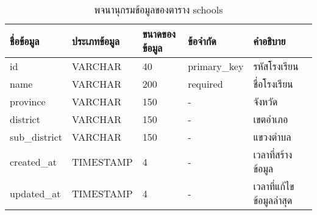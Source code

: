 \begin{table}[H]
    \caption{พจนานุกรมข้อมูลของตาราง schools}
    \label{tab:database-schools}
    \begin{tabularx}{\textwidth}{ | p{2.25cm} | p{2.20cm} | p{2.45cm} | p{2cm} | X | }
    \hline
    \textbf{ชื่อข้อมูล} & \textbf{ประเภทข้อมูล} & \textbf{ขนาดของข้อมูล} & \textbf{ข้อจำกัด} & \textbf{คำอธิบาย} \\
    \hline
    id & VARCHAR & 40 & primary\_key & รหัสโรงเรียน \\
    \hline
    name & VARCHAR & 200 & required & ชื่อโรงเรียน \\
    \hline
    province & VARCHAR & 150 & - & จังหวัด \\
    \hline
    district & VARCHAR & 150 & - & เขต\/อำเภอ \\
    \hline
    sub\_district & VARCHAR & 150 & - & แขวง\/ตำบล \\
    \hline
    created\_at & TIMESTAMP & 4 & - & เวลาที่สร้างข้อมูล \\
    \hline
    updated\_at & TIMESTAMP & 4 & - & เวลาที่แก้ไขข้อมูลล่าสุด \\
    \hline
    \end{tabularx}
\end{table}
